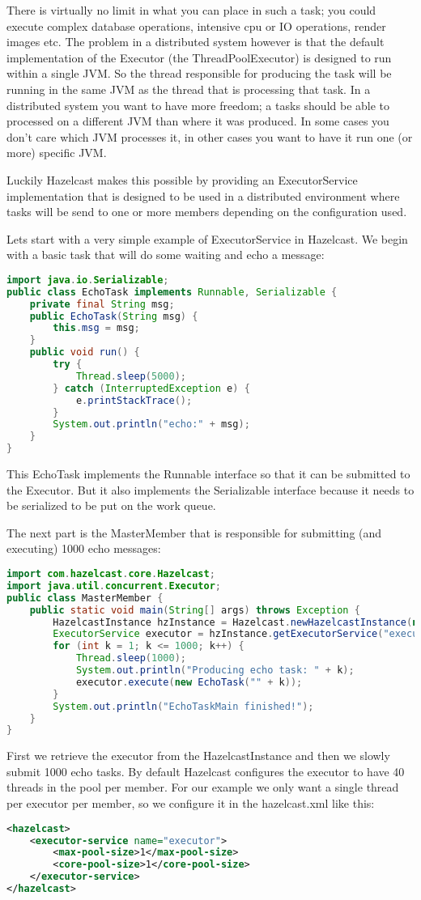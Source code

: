 There is virtually no limit in what you can place in such a task; you could execute complex database operations, intensive cpu or IO operations, render images etc. The problem in a distributed system however is that the default implementation of the Executor (the ThreadPoolExecutor) is designed to run within a single JVM. So the thread responsible for producing the task will be running in the same JVM as the thread that is processing that task. In a distributed system you want to have more freedom; a tasks should be able to processed on a different JVM than where it was produced. In some cases you don't care which JVM processes it, in other cases you want to have it run one (or more) specific JVM.

Luckily Hazelcast makes this possible by providing an ExecutorService implementation that is designed to be used in a distributed environment where tasks will be send to one or more members depending on the configuration used.

Lets start with a very simple example of ExecutorService in Hazelcast. We begin with a basic task that will do some waiting and echo a message:
\begin{lstlisting}[language=java]
import java.io.Serializable;
public class EchoTask implements Runnable, Serializable {
    private final String msg;
    public EchoTask(String msg) {
        this.msg = msg;
    }
    public void run() {
        try {
            Thread.sleep(5000);
        } catch (InterruptedException e) {
            e.printStackTrace();
        }
        System.out.println("echo:" + msg);
    }
}
\end{lstlisting}
This EchoTask implements the Runnable interface so that it can be submitted to the Executor. But it also implements the Serializable interface because it needs to be serialized to be put on the work queue.

The next part is the MasterMember that is responsible for submitting (and executing) 1000 echo messages:
\begin{lstlisting}[language=java]
import com.hazelcast.core.Hazelcast;
import java.util.concurrent.Executor;
public class MasterMember {
    public static void main(String[] args) throws Exception {
        HazelcastInstance hzInstance = Hazelcast.newHazelcastInstance(null);
        ExecutorService executor = hzInstance.getExecutorService("executor");
        for (int k = 1; k <= 1000; k++) {
            Thread.sleep(1000);
            System.out.println("Producing echo task: " + k);
            executor.execute(new EchoTask("" + k));
        }
        System.out.println("EchoTaskMain finished!");
    }
}
\end{lstlisting}
First we retrieve the executor from the HazelcastInstance and then we slowly submit 1000 echo tasks. By default Hazelcast configures the executor to have 40 threads in the pool per member. For our example we only want a single thread per executor per member, so we configure it in the hazelcast.xml like this:
\begin{lstlisting}[language=xml]
<hazelcast>
    <executor-service name="executor">
        <max-pool-size>1</max-pool-size>
        <core-pool-size>1</core-pool-size>
    </executor-service>
</hazelcast>
\end{lstlisting}

